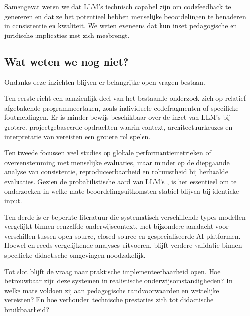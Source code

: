 \vspace{1em}

Samengevat weten we dat LLM’s technisch capabel zijn om codefeedback te genereren en dat ze het potentieel hebben menselijke beoordelingen te benaderen in consistentie en kwaliteit. We weten eveneens dat hun inzet pedagogische en juridische implicaties met zich meebrengt.

\subsection{Wat weten we nog niet?}

Ondanks deze inzichten blijven er belangrijke open vragen bestaan.

\vspace{1em}

Ten eerste richt een aanzienlijk deel van het bestaande onderzoek zich op relatief afgebakende programmeertaken, zoals individuele codefragmenten of specifieke foutmeldingen. Er is minder bewijs beschikbaar over de inzet van LLM’s bij grotere, projectgebaseerde opdrachten waarin context, architectuurkeuzes en interpretatie van vereisten een grotere rol spelen.

\vspace{1em}

Ten tweede focussen veel studies op globale performantiemetrieken of overeenstemming met menselijke evaluaties, maar minder op de diepgaande analyse van consistentie, reproduceerbaarheid en robuustheid bij herhaalde evaluaties. Gezien de probabilistische aard van LLM’s \autocite{Ye2023}, is het essentieel om te onderzoeken in welke mate beoordelingsuitkomsten stabiel blijven bij identieke input.

\vspace{1em}

Ten derde is er beperkte literatuur die systematisch verschillende types modellen vergelijkt binnen eenzelfde onderwijscontext, met bijzondere aandacht voor verschillen tussen open-source, closed-source en gespecialiseerde AI-platformen. Hoewel \textcite{Mendonca2025} en \textcite{Koutcheme2025} reeds vergelijkende analyses uitvoeren, blijft verdere validatie binnen specifieke didactische omgevingen noodzakelijk.

\vspace{1em}

Tot slot blijft de vraag naar praktische implementeerbaarheid open. Hoe betrouwbaar zijn deze systemen in realistische onderwijsomstandigheden? In welke mate voldoen zij aan pedagogische randvoorwaarden en wettelijke vereisten? En hoe verhouden technische prestaties zich tot didactische bruikbaarheid?


